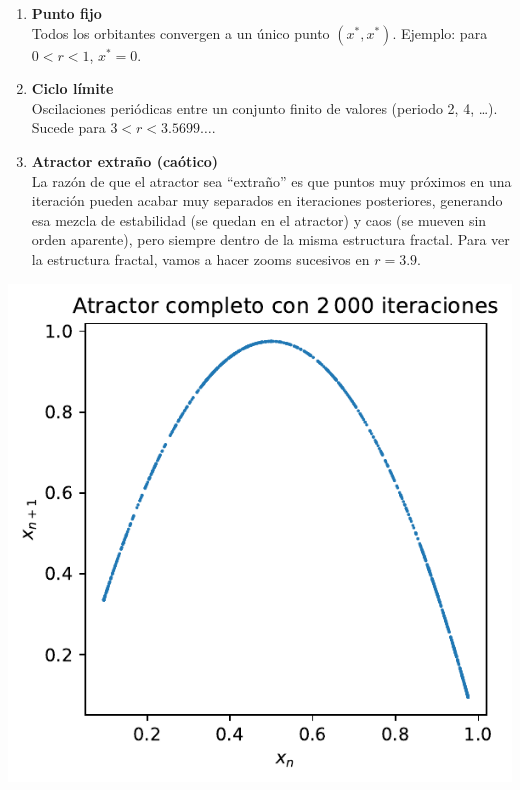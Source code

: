 \documentclass[
  10pt,
  a4paper,
  DIV=11,
  numbers=noendperiod,
  open=any]{scrreprt}
\makeatletter
\newcommand*\pandocbounded[1]{%
  \sbox\pandoc@box{#1}%
  \Gscale@div\@tempa{\textheight}{\dimexpr\ht\pandoc@box+\dp\pandoc@box\relax}%
  \Gscale@div\@tempb{\linewidth}{\wd\pandoc@box}%
  \ifdim\@tempb\p@<\@tempa\p@\let\@tempa\@tempb\fi%
  \ifdim\@tempa\p@<\p@\scalebox{\@tempa}{\usebox\pandoc@box}%
  \else\usebox{\pandoc@box}%
  \fi%
}
\numberwithin{equation}{chapter}
\numberwithin{equation}{section}
\renewcommand{\[}{\begin{equation}}
\renewcommand{\]}{\end{equation}}
\providecommand{\pandocbounded}[1]{#1}%
\renewcommand{\pandocbounded}[1]{\begingroup\centering #1\par\endgroup}
\makeatother
\begin{document}
\begin{enumerate}
\def\labelenumi{\arabic{enumi}.}
\item
  \textbf{Punto fijo}\\
  Todos los orbitantes convergen a un único punto \((x^*,x^*)\).
  Ejemplo: para \(0 < r < 1\), \(x^* = 0\).
\item
  \textbf{Ciclo límite}\\
  Oscilaciones periódicas entre un conjunto finito de valores (periodo
  2, 4, \ldots). Sucede para \(3 < r < 3.5699\ldots\).
\item
  \textbf{Atractor extraño (caótico)}\\
  La razón de que el atractor sea ``extraño'' es que puntos muy próximos
  en una iteración pueden acabar muy separados en iteraciones
  posteriores, generando esa mezcla de estabilidad (se quedan en el
  atractor) y caos (se mueven sin orden aparente), pero siempre dentro
  de la misma estructura fractal. Para ver la estructura fractal, vamos
  a hacer zooms sucesivos en \(r = 3.9\).
\end{enumerate}

\pandocbounded{\includegraphics[keepaspectratio]{04-clima/atractor_files/figure-pdf/cell-6-output-1.pdf}}
\end{document}
